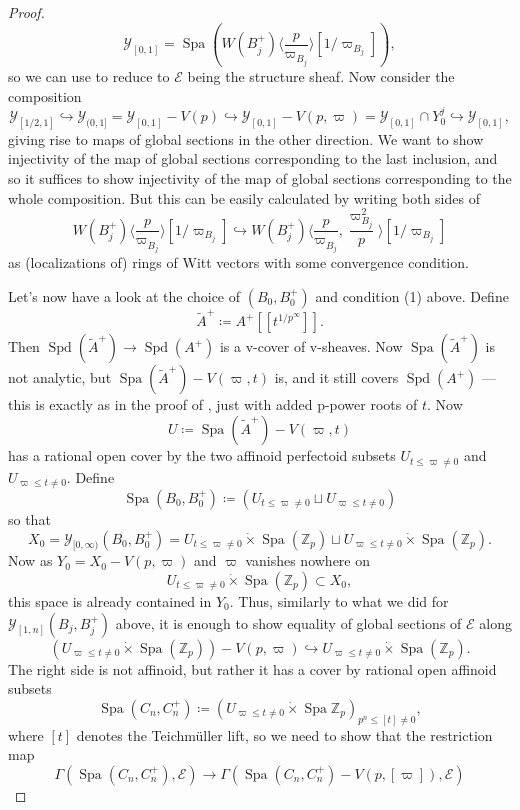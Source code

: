 \documentclass[10pt,twoside]{article}
\numberwithin{equation}{section}
\theoremstyle{plain}
\theoremstyle{definition}
\DeclareMathOperator{\Spa}{Spa}
\DeclareMathOperator{\Spd}{Spd}
\newcommand{\ZZ}{\mathbb{Z}}
\newcommand{\MCE}{\mathcal{E}}
\newcommand{\MCY}{\mathcal{Y}}
\newcommand{\Yco}{\MCY_{[0,\infty)}}
\begin{document}
\begin{proof}
\[\MCY_{[0,1]}=\Spa\left(W(B^+_j)\langle  \frac{p}{\varpi^{}_{B_j}}\rangle[1/\varpi_{B_j}]\right),\]
so we can use  to reduce to \(\MCE\) being the structure sheaf. Now consider the composition
\[\MCY_{[1/2,1]}
\hookrightarrow \MCY_{(0,1]} = \MCY_{[0,1]} -V(p)
\hookrightarrow \MCY_{[0,1]}-V(p,\varpi) = \MCY_{[0,1]} \cap Y_0^j
\hookrightarrow \MCY_{[0,1]},\]
giving rise to maps of global sections in the other direction. We want to show injectivity of the map of global sections corresponding to the last inclusion, and so it suffices to show injectivity of the map of global sections corresponding to the whole composition. But this can be easily calculated by writing both sides of
\[W(B_j^+)\langle \frac{p}{\varpi^{}_{B_j}}\rangle[1/\varpi_{B_j}] \hookrightarrow W(B_j^+)\langle \frac{p}{\varpi_{B_j}^{}}, \frac{\varpi_{B_j}^2}{p} \rangle[1/\varpi_{B_j}]\]
as (localizations of) rings of Witt vectors with some convergence condition.\par
Let's now have a look at the choice of \((B_0,B^+_0)\) and condition (1) above. Define 
\[\tilde A^+\coloneqq A^+[[t^{1/p^\infty}]].\]
Then \(\Spd(\tilde A^+)\to \Spd(A^+)\) is a v-cover of v-sheaves. Now \(\Spa(\tilde A^+)\) is not analytic, but \(\Spa(\tilde A^+)-V(\varpi,t)\) is, and it still covers \(\Spd(A^+)\) --- this is exactly as in the proof of , just with added p-power roots of \(t\). Now
\[U\coloneqq\Spa(\tilde A^+)-V(\varpi,t)\]
has a rational open cover by the two affinoid perfectoid subsets \(U_{t\leq \varpi\neq 0}\) and \(U_{\varpi\leq t\neq 0}\). Define
\[\Spa(B_0,B_0^+) \coloneqq (U_{t\leq \varpi\neq 0} \sqcup U_{\varpi\leq t\neq 0})\]
so that
\[X_0=\Yco(B_0,B^+_0)=U_{t\leq \varpi\neq 0}\dot\times\Spa(\ZZ_p)\sqcup U_{\varpi\leq t\neq 0}\dot\times \Spa(\ZZ_p).\]
Now as \(Y_0=X_0-V(p,\varpi)\) and \(\varpi\) vanishes nowhere on 
\[U_{t\leq \varpi\neq 0}\dot\times\Spa(\ZZ_p)\subset X_0,\]
this space is already contained in \( Y_0\). Thus, similarly to what we did for \(\MCY_{[1,n]}(B_j,B^+_j)\) above, it is enough to show equality of global sections of \(\MCE\) along
\[(U_{\varpi\leq t\neq 0}\dot\times \Spa(\ZZ_p))-V(p,\varpi)\hookrightarrow U_{\varpi\leq t\neq 0}\dot\times \Spa(\ZZ_p).\]
The right side is not affinoid, but rather it has a cover by rational open affinoid subsets
\[\Spa(C_n,C_n^+)\coloneqq (U_{\varpi\leq t\neq 0}\dot\times \Spa\ZZ_p)_{p^n\leq [t]\neq 0},\]
where \([t]\) denotes the Teichmüller lift, so we need to show that the restriction map
\[\Gamma(\Spa(C_n,C_n^+),\MCE)\longrightarrow \Gamma(\Spa(C_n,C_n^+)-V(p,[\varpi]),\MCE)\]

\end{proof}
\end{document}
